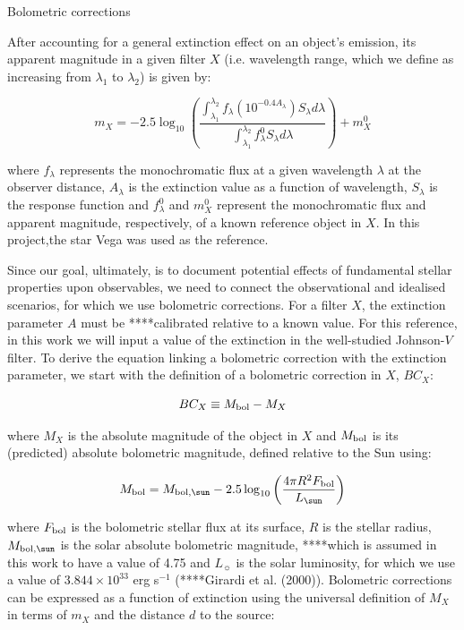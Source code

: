 \documentclass[usenatbib]{mnras}
\begin{document}
Bolometric corrections

After accounting for a general extinction effect on an object's emission, its apparent magnitude in a given filter $X$ (i.e. wavelength range, which we define as increasing from $\lambda _{1}$ to $\lambda _{2}$) is given by:

\begin{equation}
m_{X} = -2.5 \log_{10} \left(\frac{ \int_{\lambda_{1}}^{\lambda_{2}} f_{\lambda} \left( 10^{-0.4 A_{\lambda}} \right) S_{\lambda} d\lambda }{ \int_{\lambda_{1}}^{\lambda_{2}} f_{\lambda}^{0} S_{\lambda} d\lambda }\right) + m_{X}^{0}
\label{app_mag_def}
\end{equation}

where $f_{\lambda}$ represents the monochromatic flux at a given wavelength $\lambda$ at the observer distance, $A_{\lambda}$ is the extinction value as a function of wavelength, $S_{\lambda}$ is the response function and $f_{\lambda}^{0}$ and $m_{X}^{0}$ represent the monochromatic flux and apparent magnitude, respectively, of a known reference object in $X$. In this project,the star Vega was used as the reference.

Since our goal, ultimately, is to document potential effects of fundamental stellar properties upon observables, we need to connect the observational and idealised scenarios, for which we use bolometric corrections. For a filter $X$, the extinction parameter $A$ must be ****calibrated relative to a known value. For this reference, in this work we will input a value of the extinction in the well-studied Johnson-$V$ filter.
To derive the equation linking a bolometric correction with the extinction parameter, we start with the definition of a bolometric correction in $X$, $BC_{X}$:

\begin{equation}
BC_{X} \equiv M_{\textnormal{bol}} - M_{X}
\label{BC_def}
\end{equation}

where $M_{X}$ is the absolute magnitude of the object in $X$ and $M_{\textnormal{bol}}$ is its (predicted) absolute bolometric magnitude, defined relative to the Sun using:

\begin{equation}
M_{\textnormal{bol}} = M_{\textnormal{bol},\sun} - 2.5 \log_{10} \left( \frac{4\pi R^{2}F_{\textnormal{bol}}}{L_{\sun}} \right)
\label{mbol_sun}
\end{equation}

where  $F_{\textnormal{bol}}$ is the bolometric stellar flux at its surface, $R$ is the stellar radius, $M_{\textnormal{bol},\sun}$ is the solar absolute bolometric magnitude, ****which is assumed in this work to have a value of 4.75 and $L_{\sun}$ is the solar luminosity, for which we use a value of $3.844 \times 10^{33}$ erg s$^{-1}$ (****Girardi et al. (2000)). Bolometric corrections can be expressed as a function of extinction using the universal definition of $M_{X}$ in terms of $m_{X}$ and the distance $d$ to the source:
\end{document}
